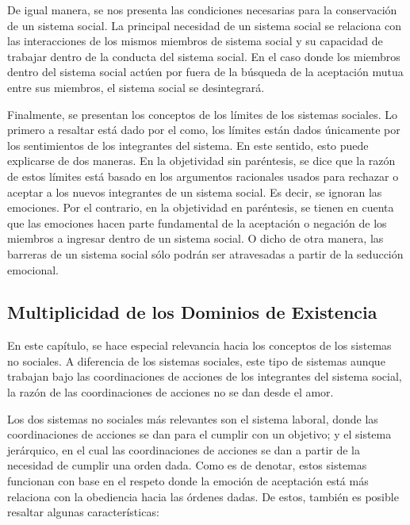 \documentclass[10pt]{article}
\begin{document}
        De igual manera, se nos presenta las condiciones necesarias para la conservación de un sistema social. La principal necesidad de un sistema social se relaciona con las interacciones de los mismos miembros de sistema social y su capacidad de trabajar dentro de la conducta del sistema social. En el caso donde los miembros dentro del sistema social actúen por fuera de la búsqueda de la aceptación mutua entre sus miembros, el sistema social se desintegrará.

        Finalmente, se presentan los conceptos de los límites de los sistemas sociales. Lo primero a resaltar está dado por el como, los límites están dados únicamente por los sentimientos de los integrantes del sistema. En este sentido, esto puede explicarse de dos maneras. En la objetividad sin paréntesis, se dice que la razón de estos límites está basado en los argumentos racionales usados para rechazar o aceptar a los nuevos integrantes de un sistema social. Es decir, se ignoran las emociones. Por el contrario, en la objetividad en paréntesis, se tienen en cuenta que las emociones hacen parte fundamental de la aceptación o negación de los miembros a ingresar dentro de un sistema social. O dicho de otra manera, las barreras de un sistema social sólo podrán ser atravesadas a partir de la seducción emocional.

        \subsection{Multiplicidad de los Dominios de Existencia}

        En este capítulo, se hace especial relevancia hacia los conceptos de los sistemas no sociales. A diferencia de los sistemas sociales, este tipo de sistemas aunque trabajan bajo las coordinaciones de acciones de los integrantes del sistema social, la razón de las coordinaciones de acciones no se dan desde el amor.

        Los dos sistemas no sociales más relevantes son el sistema laboral, donde las coordinaciones de acciones se dan para el cumplir con un objetivo; y el sistema jerárquico, en el cual las coordinaciones de acciones se dan a partir de la necesidad de cumplir una orden dada. Como es de denotar, estos sistemas funcionan con base en el respeto donde la emoción de aceptación está más relaciona con la obediencia hacia las órdenes dadas. De estos, también es posible resaltar algunas características:
        
\end{document}
